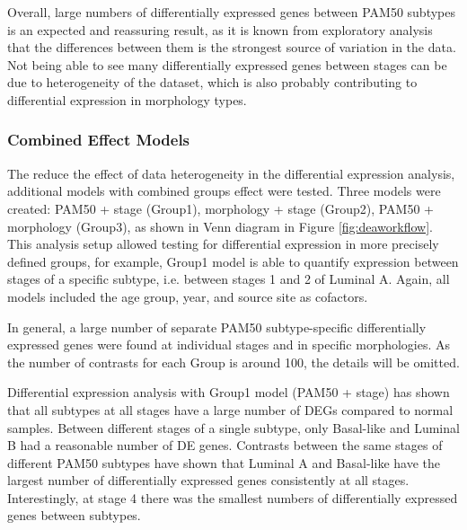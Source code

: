         Overall, large numbers of differentially expressed genes between PAM50 subtypes is an expected and reassuring result, as it is known from exploratory analysis that the differences between them is the strongest source of variation in the data. Not being able to see many differentially expressed genes between stages can be due to heterogeneity of the dataset, which is also probably contributing to differential expression in morphology types. %

        \subsubsection{Combined Effect Models}
        
        The reduce the effect of data heterogeneity in the differential expression analysis, additional models with combined groups effect were tested. Three models were created: PAM50 + stage (Group1), morphology + stage (Group2), PAM50 + morphology (Group3), as shown in Venn diagram in Figure \ref{fig:deaworkflow}. This analysis setup allowed testing for differential expression in more precisely defined groups,  for example, Group1 model is able to quantify expression between stages of a specific subtype, i.e. between stages 1 and 2 of Luminal A. Again, all models included the age group, year, and source site as cofactors.

        In general, a large number of separate PAM50 subtype-specific differentially expressed genes were found at individual stages and in specific morphologies. As the number of contrasts for each Group is around 100, the details will be omitted. 
        
        Differential expression analysis with Group1 model (PAM50 + stage) has shown that all subtypes at all stages have a large number of DEGs compared to normal samples. Between different stages of a single subtype, only Basal-like and Luminal B had a reasonable number of DE genes. Contrasts between the same stages of different PAM50 subtypes have shown that Luminal A and Basal-like have the largest number of differentially expressed genes consistently at all stages. Interestingly, at stage 4 there was the smallest numbers of differentially expressed genes between subtypes. 
        
